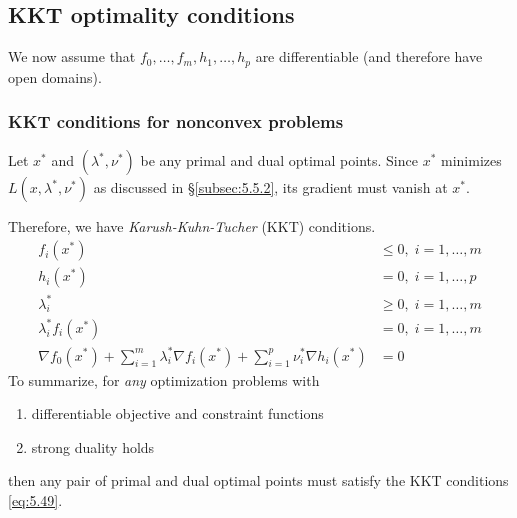 \subsection{KKT optimality conditions}
\label{subsec:5.5.3}
We now assume that $f_0,\dots,f_m,h_1,\dots,h_p$ are differentiable (and therefore have open domains).

\subsubsection{KKT conditions for nonconvex problems}
Let $x^\ast$ and $(\lambda^\ast,\nu^\ast)$ be any primal and dual optimal points.
Since $x^\ast$ minimizes $L(x,\lambda^\ast,\nu^\ast)$ as discussed in \S\ref{subsec:5.5.2}, its gradient must vanish at $x^\ast$.\par
Therefore, we have \textit{Karush-Kuhn-Tucher} (KKT) conditions.
\begin{align}
  f_i(x^\ast)               & \le 0,\;i=1,\dots,m\nonumber\\
  h_i(x^\ast)               &   = 0,\;i=1,\dots,p\nonumber\\
  \lambda_i^\ast            & \ge 0,\;i=1,\dots,m\label{eq:5.49}\\
  \lambda_i^\ast f_i(x^\ast)&   = 0,\;i=1,\dots,m\nonumber\\
  \nabla f_0(x^\ast)+\sum_{i=1}^m\lambda_i^\ast\nabla f_i(x^\ast)+\sum_{i=1}^p\nu_i^\ast\nabla h_i(x^\ast)&=0\nonumber
\end{align}
To summarize, for \textit{any} optimization problems with
\begin{enumerate}
  \item differentiable objective and constraint functions
  \item strong duality holds
\end{enumerate}
then any pair of primal and dual optimal points must satisfy the KKT conditions \eqref{eq:5.49}.

